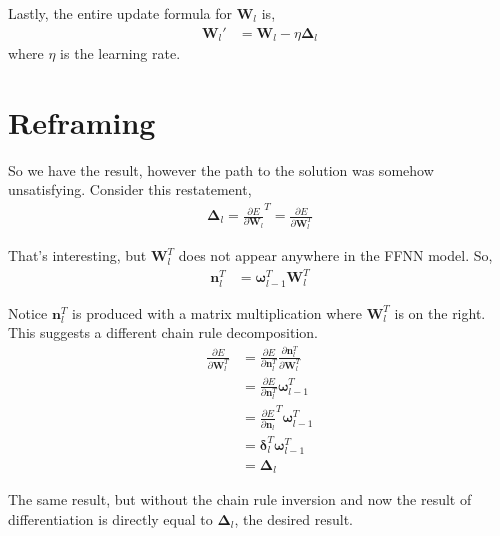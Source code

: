 \documentclass[12pt,letterpaper]{article}
\begin{document}
Lastly, the entire update formula for $\boldsymbol{W}_l$ is,
\begin{align}
\boldsymbol{W}_l'
&=
\boldsymbol{W}_l - \eta \boldsymbol{\Delta}_l
\end{align}
where $\eta$ is the learning rate.

\section{Reframing}
So we have the result, however the path to the solution was somehow unsatisfying.  Consider this restatement,
\begin{align}
\boldsymbol{\Delta}_l
=
\frac{\partial E}{\partial \boldsymbol{W}_l}^T
= 
\frac{\partial E}{\partial \boldsymbol{W}_l^T}
\end{align}

That's interesting, but $\boldsymbol{W}_l^T$ does not appear anywhere in the FFNN model.  So,
\begin{align}
\boldsymbol{n}_l^T
&= 
\boldsymbol{\omega}_{l-1}^T \boldsymbol{W}_l^T
\end{align}

Notice $\boldsymbol{n}_l^T$ is produced with a matrix multiplication where $\boldsymbol{W}_l^T$ is on the right.  This suggests a different chain rule decomposition.
\begin{align}
\frac{\partial E}{\partial \boldsymbol{W}_l^T}
&=
\frac{\partial E}{ \partial \boldsymbol{n}_l^T }
\frac{\partial \boldsymbol{n}_l^T}{\partial \boldsymbol{W}_l^T} \\
&=
\frac{\partial E}{ \partial \boldsymbol{n}_l^T }
\boldsymbol{\omega}_{l-1}^T \\
&=
\frac{\partial E}{ \partial \boldsymbol{n}_l}^T
\boldsymbol{\omega}_{l-1}^T \\
&=
\boldsymbol{\delta}_l^T
\boldsymbol{\omega}_{l-1}^T \\
&=
\boldsymbol{\Delta}_l
\end{align}

The same result, but without the chain rule inversion and now the result of differentiation is directly equal to $
\boldsymbol{\Delta}_l$, the desired result.
\end{document}
